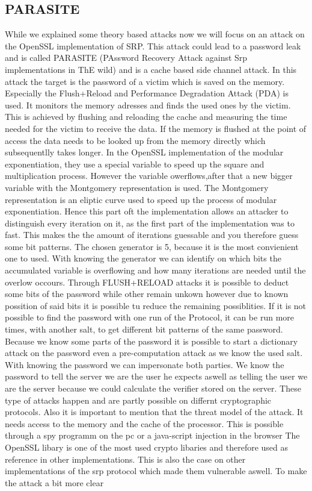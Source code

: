 \documentclass[journal]{IEEEtran}
\begin{document}
\subsection{PARASITE}
While we explained some theory based attacks now we will focus on an attack on the OpenSSL implementation of SRP.
This attack could lead to a password leak and is called PARASITE (PAssword Recovery Attack against Srp implementations in ThE wild) and is a cache based side channel attack. 
In this attack the target is the password of a victim which is saved on the memory. Especially the Flush+Reload and Performance Degradation Attack (PDA) is used.
It monitors the memory adresses and finds the used ones by the victim. This is achieved by flushing and reloading the cache and measuring the time needed for the victim to receive the data.
If the memory is flushed at the point of access the data needs to be looked up from the memory directly which subsequentlly takes longer.
In the OpenSSL implementation of the modular exponentiation, they use a special variable to speed up the square and multiplication process. However the variable owerflows,after that a new bigger variable with the Montgomery representation is used.
The Montgomery representation is an eliptic curve used to speed up the process of modular exponentiation.
Hence this part oft the implementation allows an attacker to distinguish every iteration on it, as the first part of the implementation was to fast. 
This makes the the amount of iterations guessable and you therefore guess some bit patterns.
The chosen generator is 5, because it is the most convienient one to used. With knowing the generator we can identify on which bits the accumulated variable is overflowing and how many iterations are needed until the overlow occours.
Through FLUSH+RELOAD attacks it is possible to deduct some bits of the password while other remain unkown however due to known possition of said bits it is possible tu reduce the remaining possiblities. 
If it is not possible to find the password with one run of the Protocol, it can be run more times, with another salt, to get different bit patterns of the same password.
Because we know some parts of the password it is possible to start a dictionary attack on the password even a pre-computation attack as we know the used salt.
With knowing the password we can impersonate both parties. We know the password to tell the server we are the user he expects aswell as telling the user we are the server because we could calculate the verifier stored on the server.    
These type of attacks happen and are partly possible on differnt cryptographic protocols. Also it is important to mention that the threat model of the attack.
It needs access to the memory and the cache of the processor. This is possible through a spy programm on the pc or a java-script injection in the browser 
The OpenSSL libary is one of the most used crypto libaries and therefore used as reference in other implementations. This is also the case on other implementations of the srp protocol which made them vulnerable aswell.
To make the attack a bit more clear %
\end{document}
